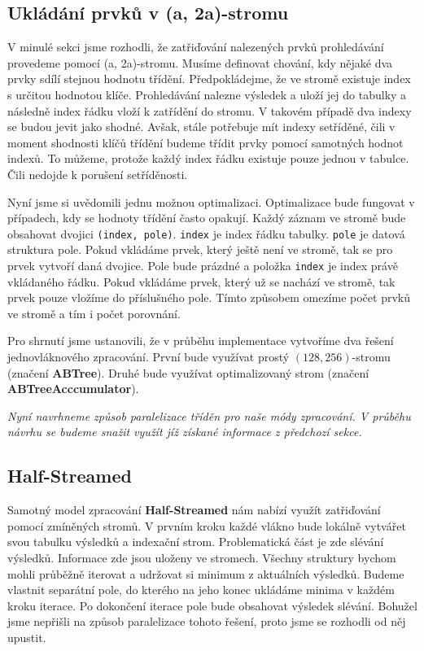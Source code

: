 \subsection{Ukládání prvků v (a, 2a)-stromu} \label{anal.improvement.orderby.storeindex}

V minulé sekci jsme rozhodli, že zatřiďování nalezených prvků prohledávání provedeme pomocí (a, 2a)-stromu.
Musíme definovat chování, kdy nějaké dva prvky sdílí stejnou hodnotu třídění.
Předpokládejme, že ve stromě existuje index s určitou hodnotou klíče.
Prohledávání nalezne výsledek a uloží jej do tabulky a následně index řádku vloží k zatřídění do stromu.
V takovém případě dva indexy se budou jevit jako shodné.
Avšak, stále potřebuje mít indexy setříděné, čili v moment shodnosti klíčů třídění budeme třídit prvky pomocí samotných hodnot indexů.
To můžeme, protože každý index řádku existuje pouze jednou v tabulce.
Čili nedojde k porušení setříděnosti.

Nyní jsme si uvědomili jednu možnou optimalizaci.
Optimalizace bude fungovat v případech, kdy se hodnoty třídění často opakují.
Každý záznam ve stromě bude obsahovat dvojici \texttt{(index, pole)}.
\texttt{index} je index řádku tabulky.
\texttt{pole} je datová struktura pole.
Pokud vkládáme prvek, který ještě není ve stromě, tak se pro prvek vytvoří daná dvojice.
Pole bude prázdné a položka \texttt{index} je index právě vkládaného řádku.
Pokud vkládáme prvek, který už se nachází ve stromě, tak prvek pouze vložíme do příslušného pole.
Tímto způsobem omezíme počet prvků ve stromě a tím i počet porovnání.

Pro shrnutí jsme ustanovili, že v průběhu implementace vytvoříme dva řešení jednovláknového zpracování.
První bude využívat prostý $(128, 256)$-stromu (značení \textbf{ABTree}).
Druhé bude využívat optimalizovaný strom (značení \textbf{ABTreeAcccumulator}).

\bigskip
\textit{Nyní navrhneme způsob paralelizace tříděn pro naše módy zpracování.
V průběhu návrhu se budeme snažit využít jíž získané informace z předchozí sekce.}

\subsection{Half-Streamed} \label{anal.improvement.orderby.halfstreamed}

Samotný model zpracování \textbf{Half-Streamed} nám nabízí využít zatřiďování pomocí zmíněných stromů.
V prvním kroku každé vlákno bude lokálně vytvářet svou tabulku výsledků a indexační strom.
Problematická část je zde slévání výsledků.
Informace zde jsou uloženy ve stromech.
Všechny struktury bychom mohli průběžně iterovat a udržovat si minimum z aktuálních výsledků.
Budeme vlastnit separátní pole, do kterého na jeho konec ukládáme minima v každém kroku iterace.
Po dokončení iterace pole bude obsahovat výsledek slévání.
Bohužel jsme nepřišli na způsob paralelizace tohoto řešení, proto jsme se rozhodli od něj upustit.

